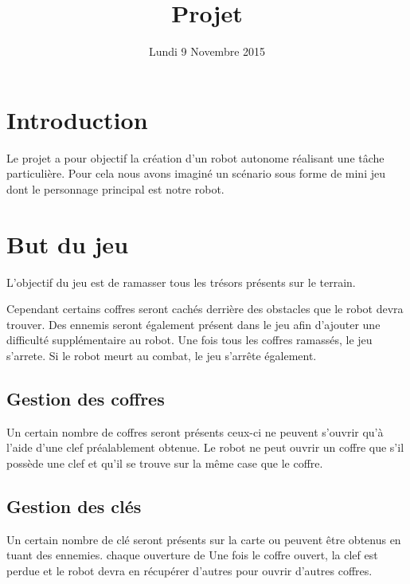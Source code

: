 \documentclass[a4paper 12pts]{article}
\title{Projet}
\date{Lundi 9 Novembre 2015}
\author{}
\begin{document}
\maketitle

\section{Introduction}
Le projet a pour objectif la création d'un robot autonome réalisant une tâche particulière.
Pour cela nous avons imaginé un scénario sous forme de mini jeu dont le personnage principal est notre robot.

\section{But du jeu}


L'objectif du jeu est de ramasser tous les trésors présents sur le terrain.


Cependant certains coffres seront cachés derrière des obstacles que le robot devra trouver. Des ennemis seront également présent dans le jeu afin d'ajouter une difficulté supplémentaire au robot.
Une fois tous les coffres ramassés, le jeu s'arrete.
Si le robot meurt au combat, le jeu s'arrête également.


\subsection{Gestion des coffres}


Un certain nombre de coffres seront présents ceux-ci ne peuvent s'ouvrir qu'à l'aide d'une clef préalablement obtenue.
Le robot ne peut ouvrir un coffre que s'il possède une clef et qu'il se trouve sur la même case que le coffre.


\subsection{Gestion des clés}


Un certain nombre de clé seront présents sur la carte ou peuvent être obtenus en tuant des ennemies.
chaque ouverture de 
Une fois le coffre ouvert, la clef est perdue et le robot devra en récupérer d'autres pour ouvrir d'autres coffres.
\end{document}
